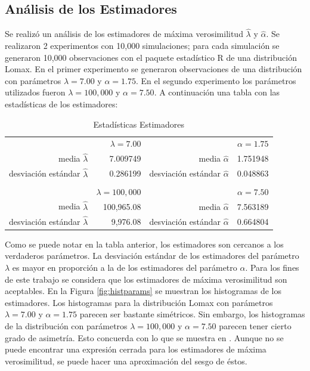 \documentclass[11pt]{article}
\numberwithin{equation}{section} %
\begin{document}
\clearpage

\subsection{Análisis de los Estimadores}
\label{sec:estim}

Se realizó un análisis de los estimadores de máxima verosimilitud $\hat{\lambda}$ y $\hat{\alpha}$. Se realizaron 2 experimentos con 10,000 simulaciones; para cada simulación se generaron 10,000 observaciones con el paquete estadístico R de una distribución Lomax. En el primer experimento se generaron observaciones de una distribución con parámetros $\lambda=7.00$ y $\alpha=1.75$. En el segundo experimento los parámetros utilizados fueron $\lambda=100,000$ y $\alpha=7.50$. A continuación una tabla con las estadísticas de los estimadores:

\begin{table}[htbp]
\centering
\caption{Estadísticas Estimadores}
\begin{tabular}{r r r r}
& $\lambda=7.00$ & & $\alpha=1.75$ \\
media $\hat{\lambda}$ & 7.009749 & media $\hat{\alpha}$ & 1.751948\\
desviación estándar $\hat{\lambda}$ & 0.286199 & desviación estándar $\hat{\alpha}$ & 0.048863\\
\\
& $\lambda=100,000$ & & $\alpha=7.50$ \\
media $\hat{\lambda}$ & 100,965.08 & media $\hat{\alpha}$ & 7.563189\\
desviación estándar $\hat{\lambda}$ & 9,976.08 & desviación estándar $\hat{\alpha}$ & 0.664804\\
\end{tabular}%
\label{tab:estim}%
\end{table}%

Como se puede notar en la tabla anterior, los estimadores son cercanos a los verdaderos parámetros. La desviación estándar de los estimadores del parámetro $\lambda$ es mayor en proporción a la de los estimadores del parámetro $\alpha$. Para los fines de este trabajo se considera que los estimadores de máxima verosimilitud son aceptables. En la Figura \ref{fig:histparams} se muestran los histogramas de los estimadores. Los histogramas para la distribución Lomax con parámetros $\lambda=7.00$ y $\alpha=1.75$ parecen ser bastante simétricos. Sin embargo, los histogramas de la distribución con parámetros $\lambda=100,000$ y $\alpha=7.50$ parecen tener cierto grado de asimetría. Esto concuerda con lo que se muestra en \cite{lomaxbias}. Aunque no se puede encontrar una expresión cerrada para los estimadores de máxima verosimilitud, se puede hacer una aproximación del sesgo de éstos.
\end{document}
